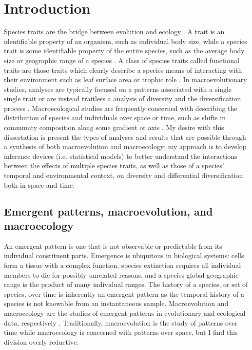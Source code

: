 \chapter{Introduction}


Species traits are the bridge between evolution and ecology \citep{Mcgill2006,Weber2017}. A trait is an identifiable property of an organism, such as individual body size, while a species trait is some identifiable property of the entire species, such as the average body size or geographic range of a species \citep{Mcgill2006}. A class of species traits called functional traits are those traits which clearly describe a species means of interacting with their environment such as leaf surface area or trophic role \citep{Mcgill2006}. In macroevolutionary studies, analyses are typically focused on a patterns associated with a single single trait or are instead traitless a analysis of diversity and the diversification process \citep{Silvestro2014a,Silvestro2015b,Pires2015a,Rabosky2013,Slater2015c,Hunt2007a,Hunt2006a,Liow2008,Payne2007}. Macroecological studies are frequently concerned with describing the distribution of species and individuals over space or time, such as shifts in community composition along some gradient or axis \citep{Smith2008b,Smith2004,Brown1995,Brown1989,Bush2007,Eronen2009,Fortelius2002,Jernvall2002,Jernvall2004}. My desire with this dissertation is present the types of analyses and results that are possible through a synthesis of both macroevolution and macroecology; my approach is to develop inference devices (i.e. statistical models) to better understand the interactions between the effects of multiple species traits, as well as those of a species' temporal and environmental context, on diversity and differential diversification both in space and time.


\section{Emergent patterns, macroevolution, and macroecology}

An emergent pattern is one that is not observable or predictable from its individual constituent parts. Emergence is ubiquitous in biological systems: cells form a tissue with a complex function, species extinction requires all individual members to die for possibly unrelated reasons, and a species global geographic range is the product of many individual ranges. The history of a species, or set of species, over time is inherently an emergent pattern as the temporal history of a species is not knowable from an instantaneous sample. Macroevolution and macroecology are the studies of emergent patterns in evolutionary and ecological data, respectively \citep{Brown1989,Brown1995,Stanley1979,Stanley1975}. Traditionally, macroevolution is the study of patterns over time while macroecology is concerned with patterns over space, but I find this division overly reductive.


